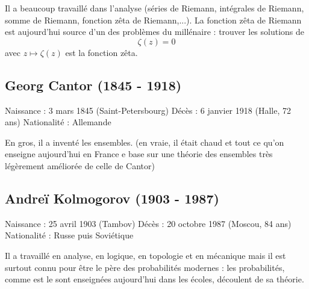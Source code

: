 Il a beaucoup travaillé dans l'analyse (séries de Riemann, intégrales de Riemann, somme de Riemann, fonction zêta de Riemann,...). La fonction zêta de Riemann est aujourd'hui source d'un des problèmes du millénaire : trouver les solutions de 
$$\zeta(z) = 0$$
avec $z\mapsto \zeta(z)$ est la fonction zêta.
\subsection*{Georg Cantor (1845 - 1918)}
Naissance : 3 mars 1845 (Saint-Petersbourg)\newline
Décès : 6 janvier 1918 (Halle, 72 ans)\newline
Nationalité : Allemande\newline

En gros, il a inventé les ensembles. (en vraie, il était chaud et tout ce qu'on enseigne aujourd'hui en France e base sur une théorie des ensembles très légèrement améliorée de celle de Cantor)

\subsection*{Andreï Kolmogorov (1903 - 1987)}
Naissance : 25 avril 1903 (Tambov)\newline
Décès : 20 octobre 1987 (Moscou, 84 ans)\newline
Nationalité : Russe puis Soviétique\newline

Il a travaillé en analyse, en logique, en topologie et en mécanique mais il est surtout connu pour être le père des probabilités modernes : les probabilités, comme est le sont enseignées aujourd'hui dans les écoles, découlent de sa théorie.


